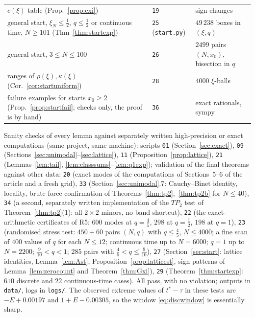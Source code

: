 \documentclass[11pt,a4paper]{article}
\theoremstyle{definition}
\theoremstyle{remark}
\begin{document}
\begin{center}
\begin{tabular}{p{}p{}p{}}
$c(\xi)$ table (Prop.~\ref{prop:cxi}) & \texttt{19} & sign changes\\
general start, $\xi_N\le\frac12$, $q\le\frac12$ or continuous time, $N\ge101$ (Thm~\ref{thm:startexp}) & \texttt{25} (\texttt{start.py}) & $49\,238$ boxes in $(\xi,q)$\\
general start, $3\le N\le100$ & \texttt{26} & $2499$ pairs $(N,x_0)$, bisection in $q$\\
ranges of $\rho(\xi),\kappa(\xi)$ (Cor.~\ref{cor:startuniform}) & \texttt{28} & $4000$ $\xi$-balls\\
failure examples for starts $x_0\ge2$ (Prop.~\ref{prop:startfail}; checks only, the proof is by hand) & \texttt{36} & exact rationals, sympy\\
\bottomrule
\end{tabular}
\end{center}
Sanity checks of every lemma against separately written high-precision or exact computations (same project, same
machine): scripts \texttt{01}
(Section~\ref{sec:exact}), \texttt{09} (Sections~\ref{sec:unimodal}--\ref{sec:lattice}), \texttt{11}
(Proposition~\ref{prop:lattice}), \texttt{21} (Lemmas~\ref{lem:tail}, \ref{lem:classsums}--\ref{lem:q1exp}); validation of the
final theorems against other data: \texttt{20} (exact modes of the computations of Sections~5--6 of the article and a fresh grid),
\texttt{33} (Section~\ref{sec:unimodal}.7: Cauchy--Binet identity,
locality, brute-force confirmation of Theorems~\ref{thm:tp2},~\ref{thm:tp2b} for $N\le40$), \texttt{34} (a second,
separately written implementation of the $TP_2$ test of Theorem~\ref{thm:tp2}(1): all $2\times2$ minors, no band shortcut),
\texttt{22} (the exact-arithmetic certificates of R5: $600$ modes at $q=\frac45$, $298$ at
$q=\frac12$, $198$ at $q=1$), \texttt{23} (randomised stress test: $450+60$ pairs $(N,q)$ with $q\le\frac45$, $N\le4000$; a fine scan of $400$ values of $q$ for each
$N\le12$; continuous time up to $N=6000$; $q=1$ up to $N=2200$; $\frac9{10}<q<1$; $285$ pairs with $\frac45<q\le\frac9{10}$), \texttt{27} (Section~\ref{sec:start}: lattice identities,
Lemma~\ref{lem:Ast}, Proposition~\ref{prop:latticest}, sign patterns of Lemma~\ref{lem:zerocount} and
Theorem~\ref{thm:Gxi}), \texttt{29} (Theorem~\ref{thm:startexp}: $610$ discrete and $22$ continuous-time cases).
All pass, with no violation; outputs in \texttt{data/}, logs in
\texttt{logs/}. The observed extreme values of $t^*-\tau$ in these tests are $-E+0.00197$ and $1+E-0.00305$, so the %
window \eqref{eq:discwindow} is essentially sharp.
\end{document}
